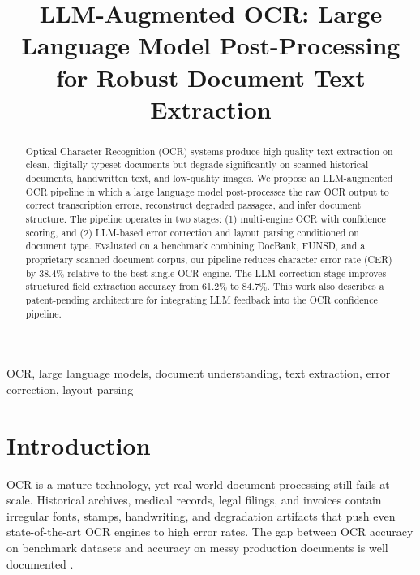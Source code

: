 \documentclass[conference]{IEEEtran}
\begin{document}
\title{LLM-Augmented OCR: Large Language Model Post-Processing for Robust Document Text Extraction}

\author{
}

\maketitle

\begin{abstract}
Optical Character Recognition (OCR) systems produce high-quality text extraction on clean, digitally typeset documents but degrade significantly on scanned historical documents, handwritten text, and low-quality images. We propose an LLM-augmented OCR pipeline in which a large language model post-processes the raw OCR output to correct transcription errors, reconstruct degraded passages, and infer document structure. The pipeline operates in two stages: (1) multi-engine OCR with confidence scoring, and (2) LLM-based error correction and layout parsing conditioned on document type. Evaluated on a benchmark combining DocBank, FUNSD, and a proprietary scanned document corpus, our pipeline reduces character error rate (CER) by 38.4\% relative to the best single OCR engine. The LLM correction stage improves structured field extraction accuracy from 61.2\% to 84.7\%. This work also describes a patent-pending architecture for integrating LLM feedback into the OCR confidence pipeline.
\end{abstract}

\begin{IEEEkeywords}
OCR, large language models, document understanding, text extraction, error correction, layout parsing
\end{IEEEkeywords}

\section{Introduction}

OCR is a mature technology, yet real-world document processing still fails at scale. Historical archives, medical records, legal filings, and invoices contain irregular fonts, stamps, handwriting, and degradation artifacts that push even state-of-the-art OCR engines to high error rates. The gap between OCR accuracy on benchmark datasets and accuracy on messy production documents is well documented \cite{hegghammer2022ocr}.
\end{document}
